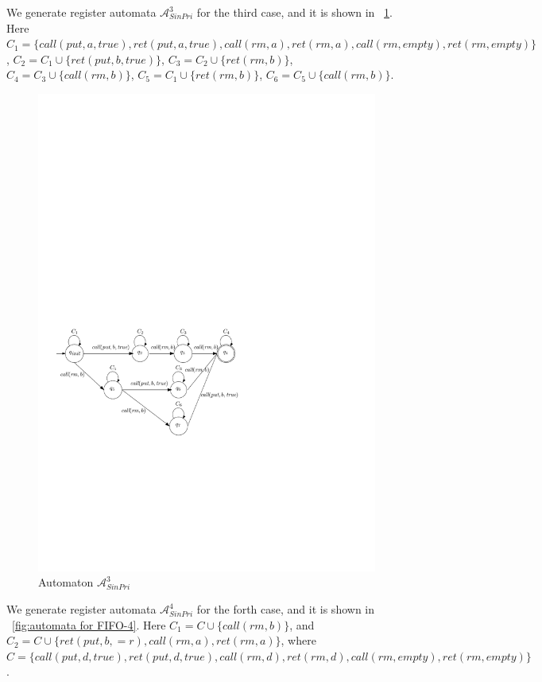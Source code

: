We generate register automata $\mathcal{A}_{\textit{SinPri}}^3$ for the third case, and it is shown in \figurename~\ref{fig:automata for FIFO-3}. Here $C_1 = \{ \textit{call}(\textit{put},a,\textit{true}),\textit{ret}(\textit{put},a,\textit{true}), \textit{call}(\textit{rm},a),\textit{ret}(\textit{rm},a),\textit{call}(\textit{rm},\textit{empty}),\textit{ret}(\textit{rm},\textit{empty}) \}$, $C_2 = C_1 \cup \{ \textit{ret}(\textit{put},b,\textit{true}) \}$, $C_3 = C_2 \cup \{ \textit{ret}(\textit{rm},b) \}$, $C_4 = C_3 \cup \{ \textit{call}(\textit{rm},b) \}$, $C_5 = C_1 \cup \{ \textit{ret}(\textit{rm},b) \}$, $C_6 = C_5 \cup \{ \textit{call}(\textit{rm},b) \}$.

\begin{figure}[htbp]
  \centering
  \includegraphics[width=0.7 \textwidth]{figures/PIC_AUTO_FIFO_3.pdf}
  \caption{Automaton $\mathcal{A}_{\textit{SinPri}}^3$}
  \label{fig:automata for FIFO-3}
\end{figure}

We generate register automata $\mathcal{A}_{\textit{SinPri}}^4$ for the forth case, and it is shown in \figurename~\ref{fig:automata for FIFO-4}. Here $C_1 = C \cup \{ \textit{call}(\textit{rm},b) \}$, and $C_2 = C \cup \{ \textit{ret}(\textit{put},b,=r), \textit{call}(\textit{rm},a), \textit{ret}(\textit{rm},a) \}$, where $C = \{ \textit{call}(\textit{put},d,\textit{true}),\textit{ret}(\textit{put},d,\textit{true}), \textit{call}(\textit{rm},d),\textit{ret}(\textit{rm},d),\textit{call}(\textit{rm},\textit{empty}),\textit{ret}(\textit{rm},\textit{empty}) \}$.

